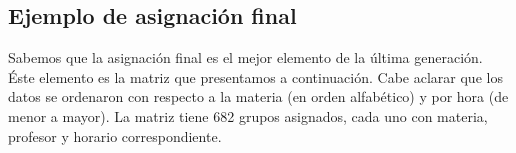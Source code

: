 \begin{appendices}
\chapter{ }







\section{Ejemplo de asignación final} \label{Ej_AsigFinal}

Sabemos que la asignación final es el mejor elemento de la última generación. Éste elemento es la matriz que presentamos a continuación. Cabe aclarar que los datos se ordenaron con respecto a la materia (en orden alfabético) y por hora (de menor a mayor). La matriz tiene 682 grupos asignados, cada uno con materia, profesor y horario correspondiente.

\dfNmatAsigFinal

%
\end{appendices}

